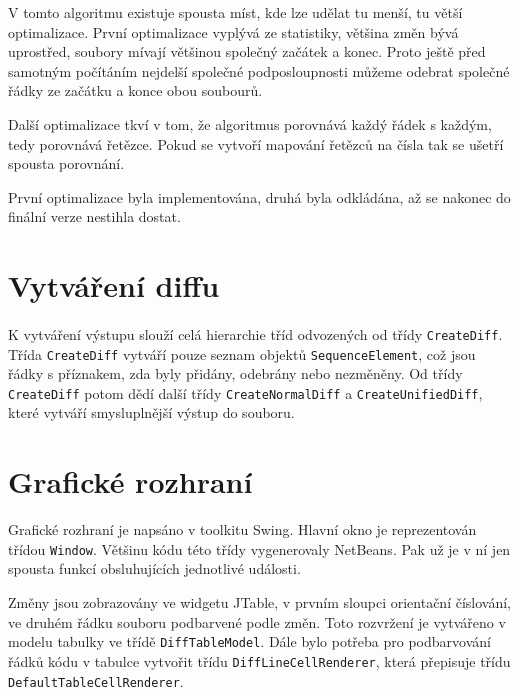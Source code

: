 \documentclass[11pt]{article}
\begin{document}
V tomto algoritmu existuje spousta míst, kde lze udělat tu menší, tu větší 
optimalizace. První optimalizace vyplývá ze statistiky, většina změn bývá 
uprostřed, soubory mívají většinou společný začátek a konec. Proto ještě před
samotným počítáním nejdelší společné podposloupnosti můžeme odebrat společné 
řádky ze začátku a konce obou soubourů. 

Další optimalizace tkví v tom, že algoritmus porovnává každý řádek s každým,
tedy porovnává řetězce. Pokud se vytvoří mapování řetězců na čísla tak se 
ušetří spousta porovnání. 

První optimalizace byla implementována, druhá byla odkládána, až se nakonec do
finální verze nestihla dostat.

\section{Vytváření diffu}

\paragraph{}
K vytváření výstupu slouží celá hierarchie tříd odvozených od třídy 
{\tt CreateDiff}. Třída {\tt CreateDiff} vytváří pouze seznam objektů 
{\tt SequenceElement}, což jsou řádky s příznakem, zda byly přidány, odebrány 
nebo nezměněny. Od třídy {\tt CreateDiff} potom dědí další třídy 
{\tt CreateNormalDiff} a {\tt CreateUnifiedDiff}, které vytváří smysluplnější 
výstup do souboru.

\section{Grafické rozhraní}
Grafické rozhraní je napsáno v toolkitu Swing. Hlavní okno je reprezentován 
třídou {\tt Window}. Většinu kódu této třídy vygenerovaly NetBeans. Pak už je 
v ní jen spousta funkcí obsluhujících jednotlivé události.

Změny jsou zobrazovány ve widgetu JTable, v prvním sloupci orientační 
číslování, ve druhém řádku souboru podbarvené podle změn. Toto rozvržení je 
vytvářeno v modelu tabulky ve třídě {\tt DiffTableModel}. Dále bylo potřeba
pro podbarvování řádků kódu v tabulce vytvořit třídu
{\tt DiffLineCellRenderer}, která přepisuje třídu 
{\tt DefaultTableCellRenderer}.
\end{document}

